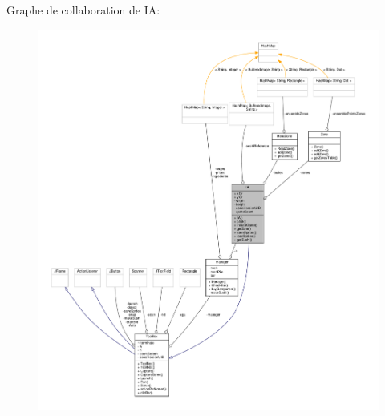 Graphe de collaboration de I\+A\+:\nopagebreak
\begin{figure}[H]
\begin{center}
\leavevmode
\includegraphics[width=350pt]{classIA__coll__graph}
\end{center}
\end{figure}
